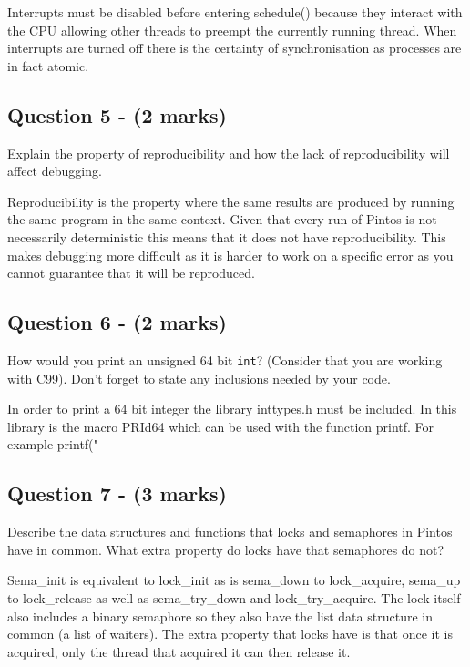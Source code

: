 \documentclass[a4paper,12pt]{article}
\begin{document}
Interrupts must be disabled before entering schedule() because they interact with the CPU allowing other threads to preempt the currently running thread. When interrupts are turned off there is the certainty of synchronisation as processes are in fact atomic.\\

\subsection*{Question 5 - (2 marks)}
Explain the property of reproducibility and how the lack of reproducibility will affect debugging.

Reproducibility is the property where the same results are produced by running the same program in the same context. Given that every run of Pintos is not necessarily deterministic this means that it does not have reproducibility. This makes debugging more difficult as it is harder to work on a specific error as you cannot guarantee that it will be reproduced.\\

\subsection*{Question 6 - (2 marks)}
How would you print an unsigned 64 bit \texttt{int}? 
(Consider that you are working with C99). 
Don't forget to state any inclusions needed by your code.

In order to print a 64 bit integer the library inttypes.h must be included. In this library is the macro PRId64 which can be used with the function printf. For example
	printf("%

\subsection*{Question 7 - (3 marks)}
Describe the data structures and functions that locks and semaphores in Pintos have in common. 
What extra property do locks have that semaphores do not?

Sema_init is equivalent to lock_init as is sema_down to lock_acquire, sema_up to lock_release as well as sema_try_down and lock_try_acquire. The lock itself also includes a binary semaphore so they also have the list data structure in common (a list of waiters).
The extra property that locks have is that once it is acquired, only the thread that acquired it can then release it. \\
\end{document}
